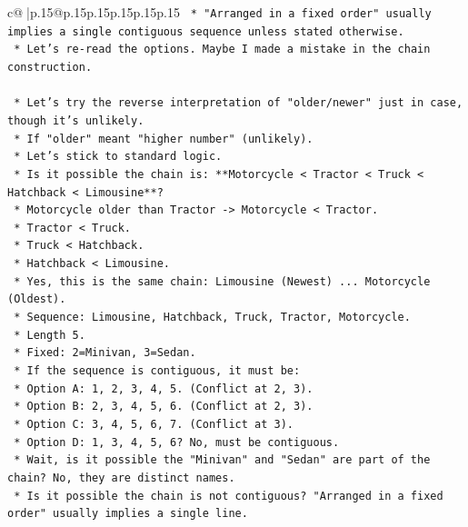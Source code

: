 \documentclass{article}
\begin{document}
{\begin{supertabular}{c@{$\;$}|p{.15\linewidth}@{}p{.15\linewidth}p{.15\linewidth}p{.15\linewidth}p{.15\linewidth}p{.15\linewidth}}
{{{\texttt{                *   "Arranged in a fixed order" usually implies a single contiguous sequence unless stated otherwise.} \\
\texttt{                *   Let's re{-}read the options. Maybe I made a mistake in the chain construction.} \\
\\ 
\texttt{    *   Let's try the reverse interpretation of "older/newer" just in case, though it's unlikely.} \\
\texttt{        *   If "older" meant "higher number" (unlikely).} \\
\texttt{        *   Let's stick to standard logic.} \\
\texttt{        *   Is it possible the chain is: **Motorcycle < Tractor < Truck < Hatchback < Limousine**?} \\
\texttt{            *   Motorcycle older than Tractor {-}> Motorcycle < Tractor.} \\
\texttt{            *   Tractor < Truck.} \\
\texttt{            *   Truck < Hatchback.} \\
\texttt{            *   Hatchback < Limousine.} \\
\texttt{            *   Yes, this is the same chain: Limousine (Newest) ... Motorcycle (Oldest).} \\
\texttt{            *   Sequence: Limousine, Hatchback, Truck, Tractor, Motorcycle.} \\
\texttt{            *   Length 5.} \\
\texttt{            *   Fixed: 2=Minivan, 3=Sedan.} \\
\texttt{            *   If the sequence is contiguous, it must be:} \\
\texttt{                *   Option A: 1, 2, 3, 4, 5. (Conflict at 2, 3).} \\
\texttt{                *   Option B: 2, 3, 4, 5, 6. (Conflict at 2, 3).} \\
\texttt{                *   Option C: 3, 4, 5, 6, 7. (Conflict at 3).} \\
\texttt{                *   Option D: 1, 3, 4, 5, 6? No, must be contiguous.} \\
\texttt{            *   Wait, is it possible the "Minivan" and "Sedan" are part of the chain? No, they are distinct names.} \\
\texttt{            *   Is it possible the chain is not contiguous? "Arranged in a fixed order" usually implies a single line.} \\
}}}
\end{supertabular}}
\end{document}

